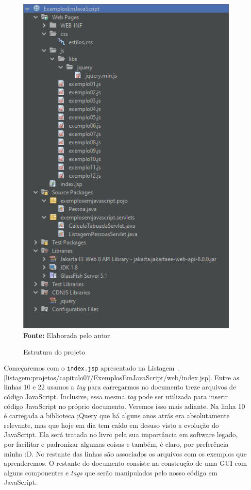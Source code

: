\FloatBarrier
\begin{figure}[!htbp]
    \centering
    \caption{Estrutura do projeto}
    \includegraphics[scale=0.7]{imagens/cap07EstruturaDoProjeto}
    \\\textbf{Fonte:} Elaborada pelo autor
    \label{fig:cap07EstruturaDoProjeto}
\end{figure}
\FloatBarrier

Começaremos com o \texttt{index.jsp} apresentado na Listagem~\thechapter.\ref{listagem:projetos/capitulo07/ExemplosEmJavaScript/web/index.jsp}. Entre as linhas 10 e 22 usamos a \textit{tag}  para carregarmos no documento treze arquivos de código JavaScript. Inclusive, essa mesma \textit{tag} pode ser utilizada para inserir código JavaScript no próprio documento. Veremos isso mais adiante. Na linha 10 é carregada a biblioteca jQuery que há alguns anos atrás era absolutamente relevante, mas que hoje em dia tem caído em desuso visto a evolução do JavaScript. Ela será tratada no livro pela sua importância em software legado, por facilitar e padronizar algumas coisas e também, é claro, por preferência minha :D. No restante das linhas são associados os arquivos com os exemplos que aprenderemos. O restante do documento consiste na construção de uma GUI com alguns componentes e \textit{tags} que serão manipulados pelo nosso código em JavaScript. 

